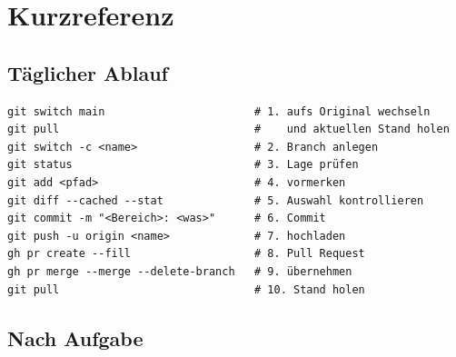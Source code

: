 \chapter{Kurzreferenz}
\label{kap:kurzreferenz}

\section*{Täglicher Ablauf}

\begin{lstlisting}[style=befehle]
git switch main                       # 1. aufs Original wechseln
git pull                              #    und aktuellen Stand holen
git switch -c <name>                  # 2. Branch anlegen
git status                            # 3. Lage prüfen
git add <pfad>                        # 4. vormerken
git diff --cached --stat              # 5. Auswahl kontrollieren
git commit -m "<Bereich>: <was>"      # 6. Commit
git push -u origin <name>             # 7. hochladen
gh pr create --fill                   # 8. Pull Request
gh pr merge --merge --delete-branch   # 9. übernehmen
git pull                              # 10. Stand holen
\end{lstlisting}

\section*{Nach Aufgabe}


